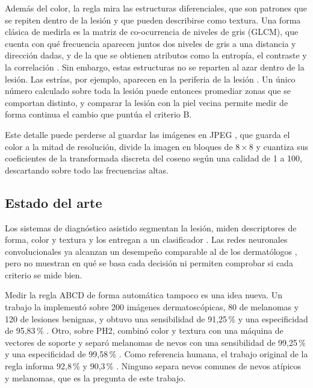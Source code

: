 Además del color, la regla mira las estructuras diferenciales, que son patrones que se repiten dentro de la lesión y que pueden describirse como textura. Una forma clásica de medirla es la matriz de co-ocurrencia de niveles de gris (GLCM), que cuenta con qué frecuencia aparecen juntos dos niveles de gris a una distancia y dirección dadas, y de la que se obtienen atributos como la entropía, el contraste y la correlación \parencite{haralick1973}. Sin embargo, estas estructuras no se reparten al azar dentro de la lesión. Las estrías, por ejemplo, aparecen en la periferia de la lesión \parencite{sadeghi2013}. Un único número calculado sobre toda la lesión puede entonces promediar zonas que se comportan distinto, y comparar la lesión con la piel vecina permite medir de forma continua el cambio que puntúa el criterio B.

Este detalle puede perderse al guardar las imágenes en JPEG \parencite{wallace1991}, que guarda el color a la mitad de resolución, divide la imagen en bloques de $8\times8$ y cuantiza sus coeficientes de la transformada discreta del coseno según una calidad de 1 a 100, descartando sobre todo las frecuencias altas.

\subsection{Estado del arte}
\label{sec:estado-arte}

Los sistemas de diagnóstico asistido segmentan la lesión, miden descriptores de forma, color y textura y los entregan a un clasificador \parencite{celebi2007}. Las redes neuronales convolucionales ya alcanzan un desempeño comparable al de los dermatólogos \parencite{esteva2017}, pero no muestran en qué se basa cada decisión ni permiten comprobar si cada criterio se mide bien.

Medir la regla ABCD de forma automática tampoco es una idea nueva. Un trabajo la implementó sobre 200 imágenes dermatoscópicas, 80 de melanomas y 120 de lesiones benignas, y obtuvo una sensibilidad de 91,25\,\% y una especificidad de 95,83\,\% \parencite{kasmi2016}. Otro, sobre PH2, combinó color y textura con una máquina de vectores de soporte y separó melanomas de nevos con una sensibilidad de 99,25\,\% y una especificidad de 99,58\,\% \parencite{oukil2022}. Como referencia humana, el trabajo original de la regla informa 92,8\,\% y 90,3\,\% \parencite{nachbar1994}. Ninguno separa nevos comunes de nevos atípicos y melanomas, que es la pregunta de este trabajo.

